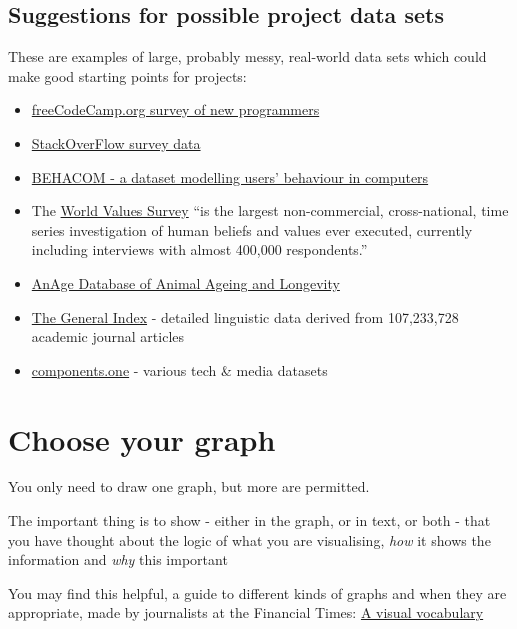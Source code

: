 \documentclass[
]{book}
\providecommand{\tightlist}{%
  \setlength{\itemsep}{0pt}\setlength{\parskip}{0pt}}
\begin{document}
\hypertarget{suggestions-for-possible-project-data-sets}{%
\subsection{Suggestions for possible project data sets}\label{suggestions-for-possible-project-data-sets}}

These are examples of large, probably messy, real-world data sets which could make good starting points for projects:

\begin{itemize}
\tightlist
\item
  \href{https://github.com/freeCodeCamp?q=new-coder-survey}{freeCodeCamp.org survey of new programmers}
\item
  \href{https://insights.stackoverflow.com/survey/}{StackOverFlow survey data}
\item
  \href{https://www.sciencedirect.com/science/article/pii/S2352340920306612}{BEHACOM - a dataset modelling users' behaviour in computers}
\item
  The \href{http://www.worldvaluessurvey.org/wvs.jsp}{World Values Survey} ``is the largest non-commercial, cross-national, time series investigation of human beliefs and values ever executed, currently including interviews with almost 400,000 respondents.''
\item
  \href{https://genomics.senescence.info/species/index.html}{AnAge Database of Animal Ageing and Longevity}
\item
  \href{https://archive.org/details/GeneralIndex}{The General Index} - detailed linguistic data derived from 107,233,728 academic journal articles
\item
  \href{https://components.one/datasets}{components.one} - various tech \& media datasets
\end{itemize}

\hypertarget{choose-your-graph}{%
\section{Choose your graph}\label{choose-your-graph}}

You only need to draw one graph, but more are permitted.

The important thing is to show - either in the graph, or in text, or both - that you have thought about the logic of what you are visualising, \emph{how} it shows the information and \emph{why} this important

You may find this helpful, a guide to different kinds of graphs and when they are appropriate, made by journalists at the Financial Times: \href{https://ft-interactive.github.io/visual-vocabulary/}{A visual vocabulary}
\end{document}
